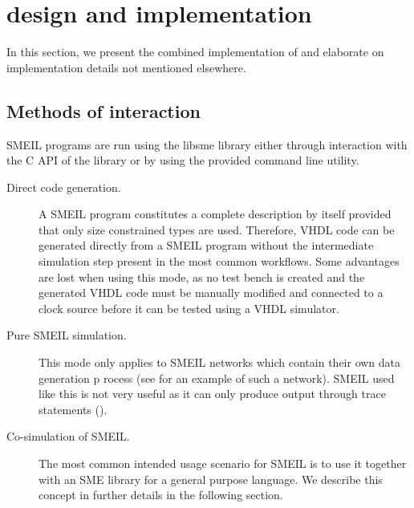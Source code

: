 \chapter{\libsme{} design and implementation}

In this section, we present the combined implementation of \libsme{} and
elaborate on implementation details not mentioned elsewhere.

\section{Methods of interaction}
\label{sec:using}
SMEIL programs are run using the {\ttfamily libsme} library either through interaction
with the C API of the library or by using the provided command line utility.

\begin{description}
\item[Direct code generation.] A SMEIL program constitutes a complete
  description by itself provided that only size constrained types are
  used. Therefore, VHDL code can be generated directly from a SMEIL program
  without the intermediate simulation step present in the most common
  workflows. Some advantages are lost when using this mode, as no test bench is
  created and the generated VHDL code must be manually modified and connected to
  a clock source before it can be tested using a VHDL simulator.
\item[Pure SMEIL simulation.] This mode only applies to SMEIL networks which
  contain their own data generation p rocess (see  for an example
  of such a network). SMEIL used like this is not very useful as it can only
  produce output through {\ttfamily trace} statements ().
  \item[Co-simulation of SMEIL.] The most common intended usage scenario for
    SMEIL is to use it together with an SME library for a general purpose
    language. We describe this concept in further details in the following
    section.
\end{description}

